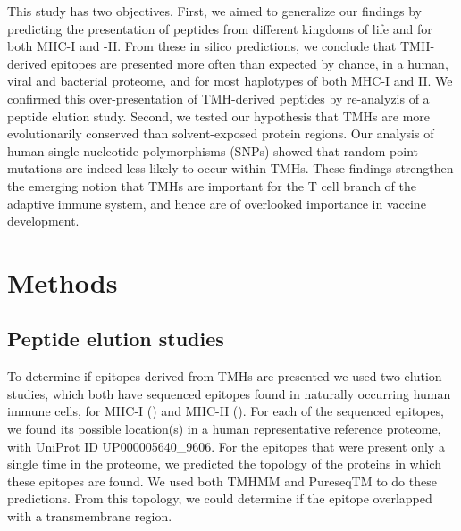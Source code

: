 This study has two objectives. First, we aimed to generalize our findings by predicting the presentation of peptides from different kingdoms of life and for both MHC-I and -II. From these in silico predictions, we conclude that TMH-derived
epitopes are presented more often than expected by chance,
in a human, viral and bacterial proteome, and for most haplotypes of both MHC-I and II. We confirmed this over-presentation of TMH-derived peptides by re-analyzis of a peptide elution study. Second, we tested our hypothesis that TMHs
are more evolutionarily conserved than  solvent-exposed protein regions. Our analysis of human
single nucleotide polymorphisms (SNPs) showed that random point mutations are indeed less likely
to occur within TMHs. These findings strengthen the emerging notion that TMHs are important for the T cell branch of the adaptive immune system, and hence are of  
overlooked importance in vaccine development.

\section{Methods}


\subsection{Peptide elution studies}\label{subsec:elution_studies}

To determine if epitopes derived from TMHs are presented 
we used two elution studies, which both have sequenced
epitopes found in naturally occurring human immune cells,
for MHC-I (\cite{schellens2015comprehensive}) 
and MHC-II (\cite{bergseng2015different}).
For each of the sequenced epitopes,
we found its possible location(s) in 
a human representative reference proteome,
with UniProt ID UP000005640\_9606.
For the epitopes that were present only a single time in the proteome,
we predicted the topology of the proteins in which these epitopes are found.
We used both TMHMM and PureseqTM to do these predictions. 
From this topology, we could determine if the epitope
overlapped with a transmembrane region.

